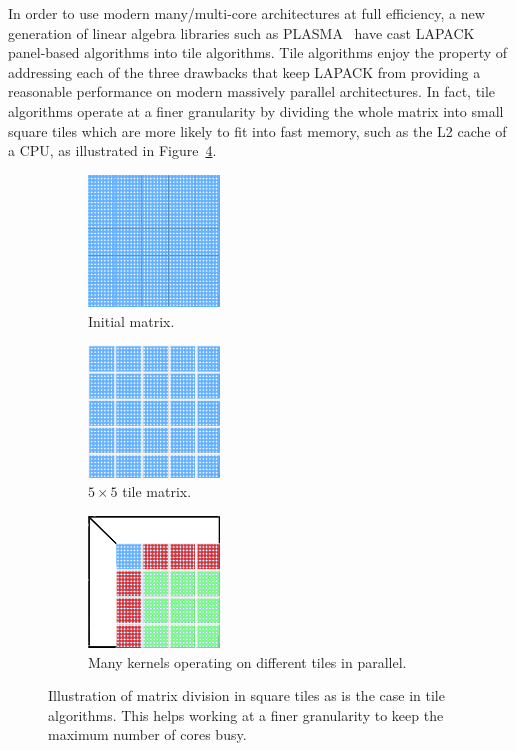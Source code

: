 In order to use modern many/multi-core architectures at full
efficiency, a new generation of linear algebra libraries such as
PLASMA~\cite{DBLP:journals/corr/abs-0709-1272}
have cast LAPACK panel-based algorithms into tile algorithms. Tile
algorithms enjoy the property of addressing each of the three
drawbacks that keep LAPACK from providing a reasonable performance on
modern massively parallel architectures.
In fact, tile algorithms operate at a
finer granularity by dividing the whole matrix into
small square tiles which are more likely to fit into fast memory,
such as the L2 cache of a CPU, as illustrated in Figure~\ref{fig:tile_algo}.
\begin{figure}[th]
  \captionsetup[subfigure]{justification=justified,singlelinecheck=false}
  \begin{subfigure}[t]{0.3 \textwidth}
    \includegraphics[width=3.5cm, height=3.5cm]{fig/one-sided-initial}
    \caption{\label{fig:initial_matrix}Initial matrix.}
  \end{subfigure}
  \hfill
  \begin{subfigure}[t]{0.3 \textwidth}
    \includegraphics[width=3.5cm, height=3.5cm]{fig/one-sided-tile}
    \caption{\label{fig:tile_matrix}
      $5\times 5$ tile matrix.}
  \end{subfigure}
  \hfill
    \begin{subfigure}[t]{0.3 \textwidth}
    \includegraphics[width=3.5cm, height=3.5cm]{fig/one-sided-tile-facto}
    \caption{\label{fig:tile_facto}
     Many kernels operating on different tiles in parallel.}
  \end{subfigure}
  \caption{Illustration of matrix division in square tiles as is the case
    in tile algorithms. This helps working at  a finer granularity to
    keep the maximum number of cores busy.}
    \label{fig:tile_algo}
\end{figure}

